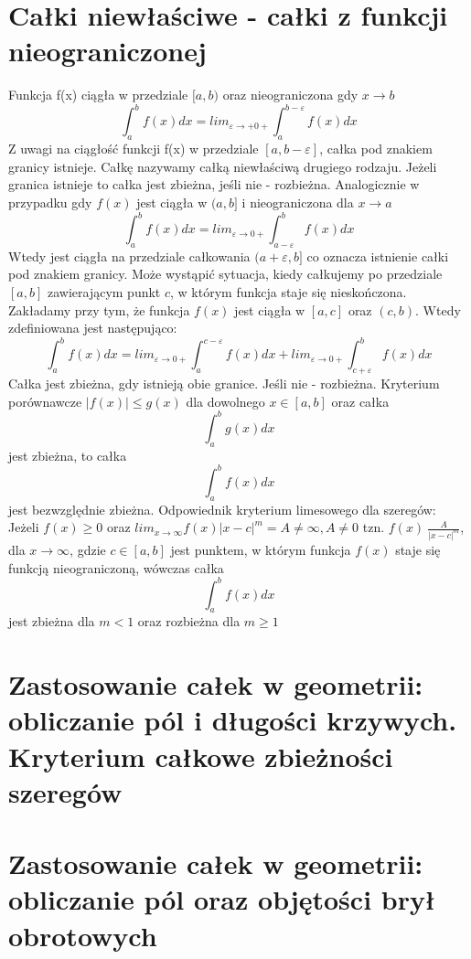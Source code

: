 \documentclass[10pt]{article}
\begin{document}
\section{Całki niewłaściwe - całki z funkcji nieograniczonej}
    Funkcja f(x) ciągła w przedziale $[a,b)$ oraz nieograniczona gdy $x \rightarrow b$ 
    $$\int_{a}^{b}f(x)dx=lim_{\varepsilon \rightarrow + 0+} \int_{a}^{b - \varepsilon}f(x)dx$$
    Z uwagi na ciągłość funkcji f(x) w przedziale $[a, b - \varepsilon]$, całka pod znakiem granicy istnieje.
    Całkę nazywamy całką niewłaściwą drugiego rodzaju.
    Jeżeli granica istnieje to całka jest zbieżna, jeśli nie - rozbieżna.
    Analogicznie w przypadku gdy $f(x)$ jest ciągła w $(a,b]$ i nieograniczona dla $x \rightarrow a$
    $$\int_{a}^{b}f(x)dx=lim_{\varepsilon \rightarrow 0+} \int_{a-\varepsilon}^{b}f(x)dx$$
    Wtedy jest ciągła na przedziale całkowania $(a+ \varepsilon, b]$ co oznacza istnienie całki pod znakiem granicy.
    Może wystąpić sytuacja, kiedy całkujemy po przedziale $[a,b]$ zawierającym punkt $c$, w którym funkcja staje się nieskończona. Zakładamy przy tym, że funkcja $f(x)$ jest ciągła w $[a,c]$ oraz $(c,b)$. Wtedy zdefiniowana jest następująco:
    $$\int_{a}^{b}f(x)dx=lim_{\varepsilon \rightarrow 0+} \int_{a}^{c - \varepsilon}f(x)dx + lim_{\varepsilon \rightarrow 0+} \int_{c + \varepsilon}^{b}f(x)dx$$
    Całka jest zbieżna, gdy istnieją obie granice. Jeśli nie - rozbieżna.
    Kryterium porównawcze
    $|f(x)| \leq g(x)$ dla dowolnego $x \in [a, b]$
    oraz całka $$\int_{a}^{b}g(x)dx$$ jest zbieżna, to całka $$\int_{a}^{b}f(x)dx$$ jest bezwzględnie zbieżna.
    Odpowiednik kryterium limesowego dla szeregów:
    Jeżeli $f(x) \geq 0$ oraz $lim_{x \rightarrow \infty} f(x)|x-c|^m=A \neq \infty, A \neq 0$ tzn. $f(x)~\frac{A}{|x-c|^m}$, dla $x \rightarrow \infty$, gdzie $c \in [a,b]$ jest punktem, w którym funkcja $f(x)$ staje się funkcją nieograniczoną, wówczas całka $$\int_{a}^{b} f(x)dx$$ jest zbieżna dla $m < 1 $ oraz rozbieżna dla $m \geq 1$
\section{Zastosowanie całek w geometrii: obliczanie pól i długości krzywych. Kryterium całkowe zbieżności szeregów}
\section{Zastosowanie całek w geometrii: obliczanie pól oraz objętości brył obrotowych}
\end{document}
